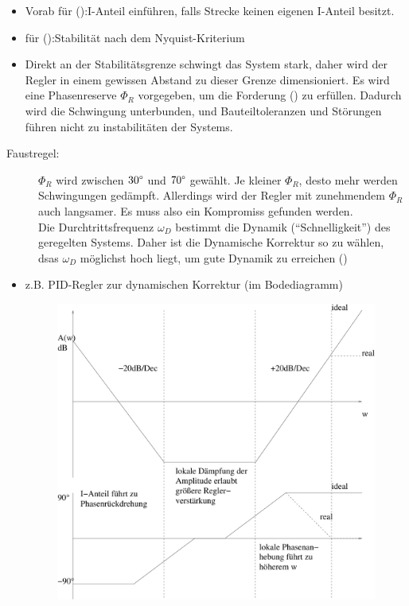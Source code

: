 \message{ !name(Mitschrieb_SysRegel.tex)}\documentclass[12pt,a4paper,ngerman]{scrartcl}
\newcommand{\RM}[1]{\MakeUppercase{\romannumeral #1{.}}}
\begin{document}
\begin{itemize}
\item Vorab für (\RM{2}):I-Anteil einführen, falls Strecke keinen eigenen I-Anteil besitzt.
\item für (\RM{1}):Stabilität nach dem Nyquist-Kriterium
\item Direkt an der Stabilitätsgrenze schwingt das System stark, daher wird der Regler in einem gewissen Abstand zu dieser Grenze dimensioniert. Es wird eine Phasenreserve $\Phi_R$ vorgegeben, um die Forderung (\RM{3}) zu erfüllen. Dadurch wird die Schwingung unterbunden, und Bauteiltoleranzen und Störungen führen nicht zu instabilitäten der Systems.
\end{itemize}
\begin{description}
\item[Faustregel:] $\Phi_R$ wird zwischen $30\degree$ und $70\degree$ gewählt. Je kleiner $\Phi_R$, desto mehr werden Schwingungen gedämpft. Allerdings wird der Regler mit zunehmendem $\Phi_R$ auch langsamer. Es muss also ein Kompromiss gefunden werden.\\
Die Durchtrittsfrequenz $\omega_D$ bestimmt die Dynamik (``Schnelligkeit'') des geregelten Systems. Daher ist die Dynamische Korrektur so zu wählen, dsas $\omega_D$ möglichst hoch liegt, um gute Dynamik zu erreichen (\RM{4})  
\end{description}
\begin{itemize}
\item z.B. PID-Regler zur dynamischen Korrektur (im Bodediagramm)
  \begin{figure}[H]
    \centering
\includegraphics[width=.7\linewidth]{sysregel_PID}
  \end{figure}
\end{itemize}
\end{document}
